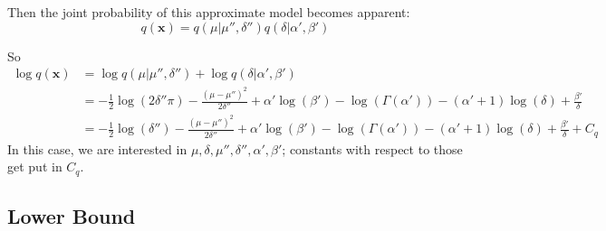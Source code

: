 \documentclass[12pt]{article}
\begin{document}
\begin{appendices}
\begin{center}
\begin{tikzpicture}[->, >=stealth, thick, scale=3.0]
\end{tikzpicture}
\end{center}

Then the joint probability of this approximate model becomes apparent:
\begin{equation}
    q(\bm{x}) = q(\mu|\mu'', \delta'')q(\delta|\alpha', \beta')
\end{equation}

So
\begin{align}
    \log{q(\bm{x})} &= \log{q(\mu|\mu'', \delta'')} + \log{q(\delta|\alpha', \beta')}
    \nonumber \\
    &= -\frac{1}{2} \log{(2\delta''\pi)} - \frac{(\mu - \mu'')^{2}}{2\delta''} +
    \alpha' \log{(\beta')} - \log{(\Gamma(\alpha'))} - (\alpha' + 1) \log{(\delta)}
    + \frac{\beta'}{\delta}
    \nonumber \\
    &= -\frac{1}{2} \log{(\delta'')} - \frac{(\mu - \mu'')^{2}}{2\delta''} +
    \alpha' \log{(\beta')} - \log{(\Gamma(\alpha'))} - (\alpha' + 1) \log{(\delta)}
    + \frac{\beta'}{\delta} + C_q
\end{align}
In this case, we are interested in $\mu, \delta, \mu'', \delta'', \alpha',
\beta'$; constants with respect to those get put in $C_q$.

\subsection{Lower Bound}


\end{appendices}
\end{document}
